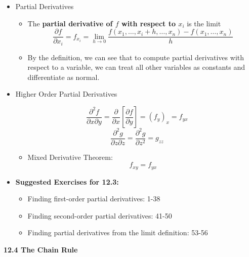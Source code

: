 \documentclass[12pt]{article}
\newcommand{\<}{\left<}
\renewcommand{\>}{\right>}
\begin{document}
\begin{itemize}

  \item Partial Derivatives 
  
    \begin{itemize}
      \item The \textbf{partial derivative of $f$ with respect to $x_i$} is the limit \[\frac{\partial f}{\partial x_i}=f_{x_i}=\lim_{h\to 0}\frac{f(x_1,\dots,x_i+h,\dots,x_n)-f(x_1,\dots,x_n)}{h}\]
      \item By the definition, we can see that to compute partial derivatives with respect to a variable, we can treat all other variables as constants and differentiate as normal.
    \end{itemize}
    
  \item Higher Order Partial Derivatives

    \[
      \frac{\partial^2 f}{\partial x\partial y} = \frac{\partial}{\partial x}\left[ \frac{\partial f}{\partial y} \right] = (f_y)_x = f_{yx}
    \] 
    \[
      \frac{\partial^2 g}{\partial z\partial z}= \frac{\partial^2 g}{\partial z^2}= g_{zz}
    \]
  
    \begin{itemize}
      \item Mixed Derivative Theorem:
        \[f_{xy}=f_{yx}\]
    \end{itemize}
  
  \item \textbf{Suggested Exercises for 12.3:}
  
    \begin{itemize}
      \item Finding first-order partial derivatives: 1-38
      \item Finding second-order partial derivatives: 41-50
      \item Finding partial derivatives from the limit definition: 53-56
    \end{itemize}

\end{itemize}

\newpage

\centerline{\bf 12.4 The Chain Rule}
\end{document}
